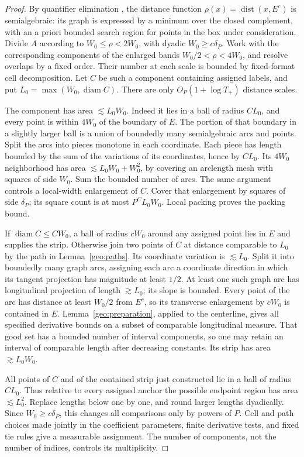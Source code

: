 \documentclass[11pt]{amsart}
\theoremstyle{definition}
\theoremstyle{remark}
\numberwithin{equation}{section}
\begin{document}
\begin{proof}
By quantifier elimination \cite[Theorem 2.77]{BPR}, the distance function $\rho(x)=\operatorname{dist}(x,E^c)$ is semialgebraic: its graph is expressed by a minimum over the closed complement, with an a priori bounded search region for points in the box under consideration. Divide $A$ according to $W_0\le\rho<2W_0$, with dyadic $W_0\ge c\delta_P$. Work with the corresponding components of the enlarged bands $W_0/2<\rho<4W_0$, and resolve overlaps by a fixed order. Their number at each scale is bounded by fixed-format cell decomposition. Let $C$ be such a component containing assigned labels, and put $L_0=\max(W_0,\operatorname{diam}C)$. There are only $O_P(1+\log T_+)$ distance scales.

The component has area $\lesssim L_0W_0$. Indeed it lies in a ball of radius $CL_0$, and every point is within $4W_0$ of the boundary of $E$. The portion of that boundary in a slightly larger ball is a union of boundedly many semialgebraic arcs and points. Split the arcs into pieces monotone in each coordinate. Each piece has length bounded by the sum of the variations of its coordinates, hence by $CL_0$. Its $4W_0$ neighborhood has area $\lesssim L_0W_0+W_0^2$, by covering an arclength mesh with squares of side $W_0$. Sum the bounded number of arcs. The same argument controls a local-width enlargement of $C$. Cover that enlargement by squares of side $\delta_P$; its square count is at most $P^CL_0W_0$. Local packing proves the packing bound.

If $\operatorname{diam}C\le CW_0$, a ball of radius $cW_0$ around any assigned point lies in $E$ and supplies the strip. Otherwise join two points of $C$ at distance comparable to $L_0$ by the path in Lemma~\ref{geo:paths}. Its coordinate variation is $\lesssim L_0$. Split it into boundedly many graph arcs, assigning each arc a coordinate direction in which its tangent projection has magnitude at least $1/2$. At least one such graph arc has longitudinal projection of length $\gtrsim L_0$; its slope is bounded. Every point of the arc has distance at least $W_0/2$ from $E^c$, so its transverse enlargement by $cW_0$ is contained in $E$. Lemma~\ref{geo:preparation}, applied to the centerline, gives all specified derivative bounds on a subset of comparable longitudinal measure. That good set has a bounded number of interval components, so one may retain an interval of comparable length after decreasing constants. Its strip has area $\gtrsim L_0W_0$.

All points of $C$ and of the contained strip just constructed lie in a ball of radius $CL_0$. Thus relative to every assigned anchor the possible endpoint region has area $\lesssim L_0^2$. Replace lengths below one by one, and round larger lengths dyadically. Since $W_0\ge c\delta_P$, this changes all comparisons only by powers of $P$. Cell and path choices made jointly in the coefficient parameters, finite derivative tests, and fixed tie rules give a measurable assignment. The number of components, not the number of indices, controls its multiplicity.
\end{proof}
\end{document}

